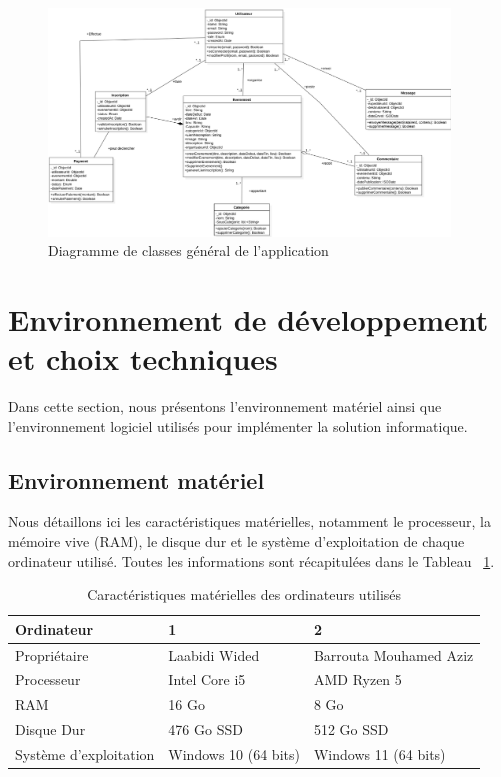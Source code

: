 \begin{figure}[H]
    \centering
    \includegraphics[width=0.95\textwidth]{projet/images/diagramme de sequance/images/diagramme de classe.png}
    \caption{Diagramme de classes général de l'application}
    \label{fig:diagramme_classe}
\end{figure}

\section{Environnement de développement et choix techniques}

Dans cette section, nous présentons l’environnement matériel ainsi que l’environnement logiciel utilisés pour implémenter la solution informatique.

\subsection{Environnement matériel}

Nous détaillons ici les caractéristiques matérielles, notamment le processeur, la mémoire vive (RAM), le disque dur et le système d’exploitation de chaque ordinateur utilisé. Toutes les informations sont récapitulées dans le Tableau ~\ref{tab:environnement_materiel}.

\begin{table}[H]
\centering
\begin{tabular}{|l|l|l|}
\hline
\textbf{Ordinateur} & \textbf{1} & \textbf{2} \\ \hline
Propriétaire & Laabidi Wided & Barrouta Mouhamed Aziz \\ \hline
Processeur & Intel Core i5 & AMD Ryzen 5 \\ \hline
RAM & 16 Go & 8 Go \\ \hline
Disque Dur & 476 Go SSD & 512 Go SSD \\ \hline
Système d’exploitation & Windows 10 (64 bits) & Windows 11 (64 bits) \\ \hline
\end{tabular}
\caption{Caractéristiques matérielles des ordinateurs utilisés}
\label{tab:environnement_materiel}
\end{table}
